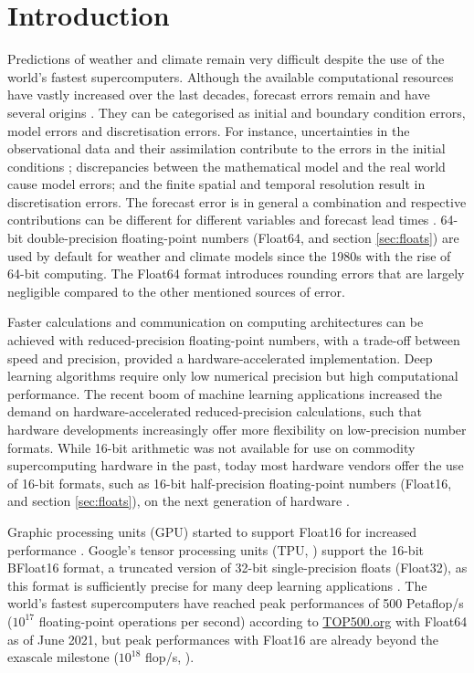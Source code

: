 \section{Introduction}

Predictions of weather and climate remain very difficult despite the use of the world's fastest supercomputers. Although the available
computational resources have vastly increased over the last decades, forecast errors remain and have several origins
\citep{Palmer2012,Palmer2015}. They can be categorised as initial and boundary condition errors, model errors and discretisation
errors. For instance, uncertainties in the observational data and their assimilation contribute to the errors in the initial conditions
\citep{Ghil1991}; discrepancies between the mathematical model and the real world cause model errors; and the finite spatial and
temporal resolution result in discretisation errors. The forecast error is in general a combination and respective contributions can be
different for different variables and forecast lead times \citep{Jung2010,Palmer2019a}. 64-bit double-precision floating-point numbers
(Float64, \cite{IEEE1985} and section \ref{sec:floats}) are used by default for weather and climate models since the 1980s with the
rise of 64-bit computing. The Float64 format introduces rounding errors \citep{Higham2002} that are largely negligible compared
to the other mentioned sources of error.

Faster calculations and communication on computing architectures can be achieved with reduced-precision floating-point numbers,
with a trade-off between speed and precision, provided a hardware-accelerated implementation. Deep learning algorithms require
only low numerical precision \citep{Wang2018,Sun2020} but high computational performance. The recent boom of machine learning
applications increased the demand on hardware-accelerated reduced-precision calculations, such that hardware developments
increasingly offer more flexibility on low-precision number formats. While 16-bit arithmetic was not available for use on commodity
supercomputing hardware in the past, today most hardware vendors offer the use of 16-bit formats, such as 16-bit half-precision
floating-point numbers (Float16, \cite{IEEE2008} and section \ref{sec:floats}), on the next generation of hardware
\citep{Sato2020,Burgess2019}.

Graphic processing units (GPU) started to support Float16 for increased performance \citep{Markidis2018}. Google's tensor processing
units (TPU, \cite{Jouppi2017,Jouppi2018}) support the 16-bit BFloat16 format, a truncated version of 32-bit single-precision floats (Float32),
as this format is sufficiently precise for many deep learning applications \citep{Kalamkar2019,Burgess2019,Gupta2015}. The world's fastest
supercomputers have reached peak performances of 500 Petaflop/s ($10^{17}$
floating-point operations per second) according to \href{https://top500.org}{TOP500.org} \citep{Dongarra2011} with Float64 as of June 2021,
but peak performances with Float16 are already beyond the exascale milestone ($10^{18}$ flop/s, \cite{Kurth2018,Kudo2020a}).

